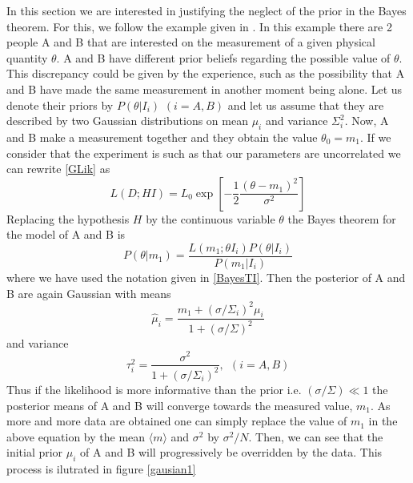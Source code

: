 \documentclass[onecolumn,           %
               showpacs,            %
               preprintnumbers,     %
               aps,                 %
               prl,          	    %
               letterpaper,             %
               superscriptaddress,      %
               nofootinbib,         %
               tightenlines,        %
               floats,floatfix      %
               ,usenatbib,
               ]{revtex4-1}
\begin{document}
In this section we are interested in justifying the neglect of the prior in the Bayes theorem. For this, we follow the example given in \cite{RobT}. In this example there are 2 people A and B that are interested on the measurement of a given physical quantity $\theta$. A and B have different prior beliefs regarding the possible value of $\theta$. This discrepancy could be given by the experience, such as the possibility that A and B have made the same measurement in another moment being alone. Let us denote their priors by $P(\theta|I_i)$ $(i=A,B)$ and let us assume that they are described by two Gaussian distributions on mean $\mu_i$ and variance $\Sigma_i^2$. Now, A and B make a measurement together and they obtain the value $\theta_0=m_1$. If we consider that the experiment is such as that our parameters are uncorrelated we can rewrite \eqref{GLik} as
\begin{equation}\label{LikG}
L(D;HI)=L_0\exp\left[-\frac{1}{2}\frac{(\theta-m_1)^2}{\sigma^2}\right]
\end{equation}
Replacing the hypothesis $H$ by the continuous variable $\theta$ the Bayes theorem for the model of A and B is
\begin{equation}
P(\theta|m_1)=\frac{L(m_1;\theta I_i)P(\theta|I_i)}{P(m_1|I_i)}
\end{equation}
where we have used the notation given in \eqref{BayesTI}. Then the posterior of A and B are again Gaussian with means
\begin{equation}
\hat \mu_i = \frac{m_1+(\sigma/\Sigma_i)^2\mu_i}{1+(\sigma/\Sigma)^2}
\end{equation}
and variance 
\begin{equation}
\tau_i^2=\frac{\sigma^2}{1+(\sigma/\Sigma_i)^2}, \ \ (i=A,B)
\end{equation}
Thus if the likelihood is more informative than the prior i.e. $(\sigma/\Sigma)\ll 1$ the posterior means of A and B will converge towards the measured value, $m_1$. As more and more data are obtained one can simply replace the value of $m_1$ in the above equation by the mean $\langle m\rangle$ and $\sigma^2$ by $\sigma^2/N$. Then, we can see that the initial prior $\mu_i$ of A and B will progressively be overridden by the data. This process is ilutrated in figure \ref{gausian1} 
\end{document}
